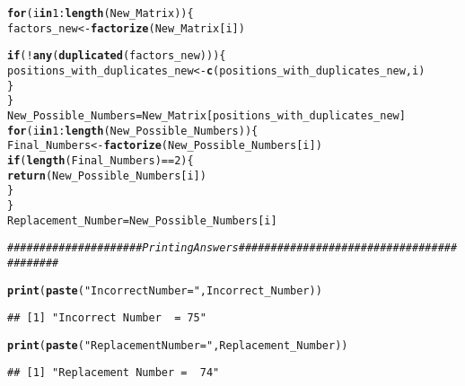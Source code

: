 \documentclass{article}\usepackage[]{graphicx}\usepackage[]{xcolor}
\makeatletter
\newcommand{\hlnum}[1]{\textcolor[rgb]{0.686,0.059,0.569}{#1}}%
\newcommand{\hlsng}[1]{\textcolor[rgb]{0.192,0.494,0.8}{#1}}%
\newcommand{\hlcom}[1]{\textcolor[rgb]{0.678,0.584,0.686}{\textit{#1}}}%
\newcommand{\hlopt}[1]{\textcolor[rgb]{0,0,0}{#1}}%
\newcommand{\hldef}[1]{\textcolor[rgb]{0.345,0.345,0.345}{#1}}%
\newcommand{\hlkwa}[1]{\textcolor[rgb]{0.161,0.373,0.58}{\textbf{#1}}}%
\newcommand{\hlkwb}[1]{\textcolor[rgb]{0.69,0.353,0.396}{#1}}%
\newcommand{\hlkwd}[1]{\textcolor[rgb]{0.737,0.353,0.396}{\textbf{#1}}}%
\newenvironment{kframe}{%
 \def\at@end@of@kframe{}%
 \ifinner\ifhmode%
  \def\at@end@of@kframe{\end{minipage}}%
  \begin{minipage}{\columnwidth}%
 \fi\fi%
 \def\FrameCommand##1{\hskip\@totalleftmargin \hskip-\fboxsep
 \colorbox{shadecolor}{##1}\hskip-\fboxsep
     \hskip-\linewidth \hskip-\@totalleftmargin \hskip\columnwidth}%
 \MakeFramed {\advance\hsize-\width
   \@totalleftmargin\z@ \linewidth\hsize
   \@setminipage}}%
 {\par\unskip\endMakeFramed%
 \at@end@of@kframe}
\newenvironment{knitrout}{}{} %
\makeatother
\begin{document}
\begin{enumerate}
\begin{knitrout}
\begin{kframe}
\begin{alltt}
\hlkwa{for} \hldef{(i} \hlkwa{in} \hlnum{1}\hlopt{:}\hlkwd{length}\hldef{(New_Matrix)) \{}
  \hldef{factors_new} \hlkwb{<-} \hlkwd{factorize}\hldef{(New_Matrix[i])}

  \hlkwa{if} \hldef{(}\hlopt{!}\hlkwd{any}\hldef{(}\hlkwd{duplicated}\hldef{(factors_new))) \{}
    \hldef{positions_with_duplicates_new} \hlkwb{<-} \hlkwd{c}\hldef{(positions_with_duplicates_new, i)}
  \hldef{\}}
\hldef{\}}
\hldef{New_Possible_Numbers} \hlkwb{=} \hldef{New_Matrix[positions_with_duplicates_new]}
\hlkwa{for} \hldef{(i} \hlkwa{in} \hlnum{1}\hlopt{:}\hlkwd{length}\hldef{(New_Possible_Numbers)) \{}
  \hldef{Final_Numbers} \hlkwb{<-} \hlkwd{factorize}\hldef{(New_Possible_Numbers[i])}
  \hlkwa{if} \hldef{(}\hlkwd{length}\hldef{(Final_Numbers)} \hlopt{==} \hlnum{2}\hldef{) \{}
    \hlkwd{return}\hldef{(New_Possible_Numbers[i])}
  \hldef{\}}
\hldef{\}}
\hldef{Replacement_Number} \hlkwb{=} \hldef{New_Possible_Numbers[i]}

\hlcom{#####################Printing Answers##########################################}

\hlkwd{print}\hldef{(}\hlkwd{paste}\hldef{(}\hlsng{"Incorrect Number  ="} \hldef{, Incorrect_Number))}
\end{alltt}
\begin{verbatim}
## [1] "Incorrect Number  = 75"
\end{verbatim}
\begin{alltt}
\hlkwd{print}\hldef{(}\hlkwd{paste}\hldef{(}\hlsng{"Replacement Number = "}\hldef{, Replacement_Number))}
\end{alltt}
\begin{verbatim}
## [1] "Replacement Number =  74"
\end{verbatim}
\end{kframe}
\end{knitrout}

\end{enumerate}


\end{document}
